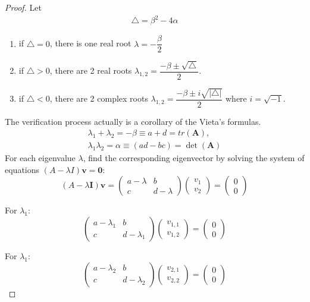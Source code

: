 \documentclass[11pt,a4paper]{book}
\theoremstyle{definition}\newtheorem{definition}{Definition}
\theoremstyle{definition}\newtheorem{fact}{Fact}
\theoremstyle{definition}\newtheorem{remark}{Remark}
\theoremstyle{definition}\newtheorem{ex}{Ex.}
\theoremstyle{definition}\newtheorem{project}{Project}
\theoremstyle{definition}\newtheorem{problem}{Problem}
\theoremstyle{definition}\newtheorem{example}{Example}
\numberwithin{theorem}{section}
\numberwithin{corollary}{chapter}
\numberwithin{assumption}{chapter}
\numberwithin{definition}{chapter}
\numberwithin{prop}{chapter}
\numberwithin{notation}{chapter}
\numberwithin{problem}{chapter}
\numberwithin{example}{chapter}
\numberwithin{fact}{chapter}
\numberwithin{ex}{chapter}
\def\A{\mathbf A}
\def\I{\mathbf I}
\begin{document}
\begin{proof}
		Let 
		\begin{align*}
			\triangle = \beta^2 - 4\alpha
		\end{align*}
		\begin{enumerate}
			\item if $\triangle= 0$, there is one real root $\lambda = - \dfrac{\beta}{2}$ 
			\item if $\triangle > 0$, there are 2 real roots $\lambda_{1,2} = \dfrac{-\beta \pm \sqrt{\triangle} }{2}$.
			\item if $\triangle < 0$, there are 2 complex roots $\lambda_{1,2} = \dfrac{-\beta \pm i \sqrt{|\triangle|} }{2}$ where $i = \sqrt{-1}$.
		\end{enumerate}
		The verification process actually is a corollary of the Vieta's formulas.
		\begin{align*}
			\lambda_1 + \lambda_2 = - \beta \equiv a + d = tr(\A), \\
			\lambda_1 \lambda_2 = \alpha \equiv (ad - bc) = \det(\A)
		\end{align*}
		For each eigenvalue \(\lambda\), find the corresponding eigenvector by solving the system of equations \((A - \lambda I)\mathbf{v} = \mathbf{0}\):
\[(A - \lambda \I)\mathbf{v} = \begin{pmatrix}
a - \lambda & b \\
c & d - \lambda
\end{pmatrix} \begin{pmatrix}
v_1 \\
v_2
\end{pmatrix} = \begin{pmatrix}
0 \\
0
\end{pmatrix}\]
	
	For \(\lambda_1\):
\[
\begin{pmatrix}
a - \lambda_1 & b \\
c & d - \lambda_1
\end{pmatrix}
\begin{pmatrix}
v_{1,1} \\
v_{1,2}
\end{pmatrix}
=
\begin{pmatrix}
0 \\
0
\end{pmatrix}\]	
	
	For \(\lambda_1\):
\[
\begin{pmatrix}
a - \lambda_2 & b \\
c & d - \lambda_2
\end{pmatrix}
\begin{pmatrix}
v_{2,1} \\
v_{2,2}
\end{pmatrix}
=
\begin{pmatrix}
0 \\
0
\end{pmatrix}\]	
		
	\end{proof}
	
\end{document}
